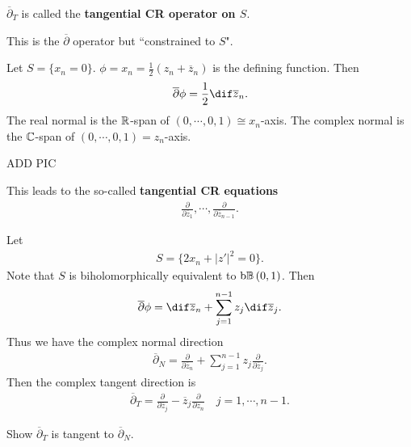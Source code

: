 \begin{definition}
    $\overline{\partial}_T$ is called the \textbf{tangential CR operator on $S$}.
\end{definition}

This is the $\overline{\partial}$ operator but ``constrained to $S$".

\begin{example}
    Let $S = \{ x_n = 0 \}$. $\phi = x_n = \frac{1}{2} ( z_n + \overline{z}_n)$ is the defining function. Then
    \begin{align*}
        \overline{\partial} \phi = \frac{1}{2} \dif \overline{z}_n.
    \end{align*}
    The real normal is the $\mathbb{R}$-span of $(0, \cdots, 0 , 1) \cong x_n$-axis. The complex normal is the $\mathbb{C}$-span of $(0, \cdots, 0 ,1) = z_n$-axis.

    ADD PIC
\end{example}

This leads to the so-called \textbf{tangential CR equations}
\begin{align*}
    \frac{\partial }{\partial \overline{z}_1} , \cdots, \frac{\partial }{\partial \overline{z}_{n-1}}.
\end{align*}

\begin{example}
    Let
    \begin{align*}
        S = \{ 2 x_n + | z'|^2 = 0 \}.
    \end{align*}
    Note that $S$ is biholomorphically equivalent to $\bdy \ball{0}{1}$. Then
    \begin{align*}
        \overline{\partial} \phi = \dif \overline{z}_n + \sum_{j=1}^{n-1} z_j \dif \overline{z}_j.
    \end{align*}
    Thus we have the complex normal direction
    \begin{align*}
        \overline{\partial}_N = \frac{\partial}{\partial \overline{z}_n} + \sum_{j=1}^{n-1} z_j \frac{\partial }{\partial \overline{z}_j}.
    \end{align*}
    Then the complex tangent direction is
    \begin{align*}
        \overline{\partial}_T = \frac{\partial}{\partial \overline{z}_j} - \overline{z}_j \frac{\partial }{\partial z_n} \quad j = 1, \cdots, n-1.
    \end{align*}
\end{example}
\begin{exercise}
    Show $\overline{\partial}_T$ is tangent to $\overline{\partial}_N$.
\end{exercise}

